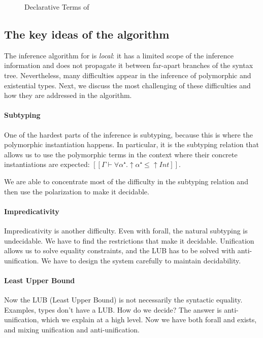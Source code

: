 \begin{figure}[h]
  \begin{multicols}{2}
    \ottgrammartabular{
      \ottc\ottinterrule
    }

    \ottgrammartabular{
      \ottv\ottinterrule
    }
  \end{multicols}
  \caption{Declarative Terms of \fexists}
  \label{fig:declarative-terms}
\end{figure}

\subsection{The key ideas of the algorithm}

The inference algorithm for \fexists is \emph{local}: it has a limited scope of
the inference information and does not propagate it between far-apart branches
of the syntax tree. Nevertheless, many difficulties appear in the inference of
polymorphic and existential types. Next, we discuss the most challenging of
these difficulties and how they are addressed in the algorithm.

\paragraph{Subtyping} One of the hardest parts of the inference is subtyping,
because this is where the polymorphic instantiation happens. In particular, it
is the subtyping relation that allows us to use the polymorphic terms in the
context where their concrete instantiations are expected: 
$[[Γ ⊢ ∀α⁺.↑α⁺ ≤ ↑Int]]$.

We are able to concentrate most of the difficulty in the subtyping relation 
and then use the polarization to make it decidable. 

\paragraph{Impredicativity}
Impredicativity is another difficulty. Even with forall, the natural subtyping is undecidable. We have to find the restrictions that make it decidable. Unification allows us to solve equality constraints, and the LUB has to be solved with anti-unification. We have to design the system carefully to maintain decidability.

\paragraph{Least Upper Bound}
Now the LUB (Least Upper Bound) is not necessarily the syntactic equality. Examples, types don't have a LUB. How do we decide? The answer is anti-unification, which we explain at a high level. Now we have both forall and exists, and mixing unification and anti-unification.

